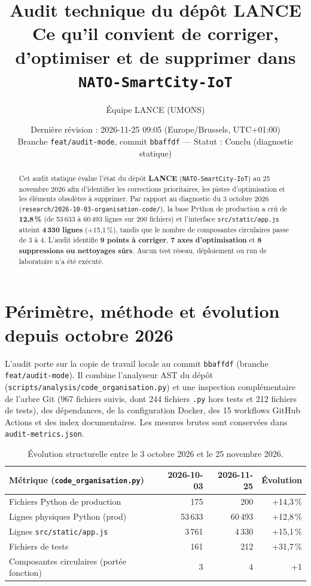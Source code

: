 \documentclass[11pt,a4paper]{article}
\title{\textbf{Audit technique du dépôt LANCE}\\
\large Ce qu'il convient de corriger, d'optimiser et de supprimer dans \texttt{NATO-SmartCity-IoT}}
\author{Équipe LANCE (UMONS)}
\date{Dernière révision : 2026-11-25 09:05 (Europe/Brussels, UTC+01:00)\\
Branche \texttt{feat/audit-mode}, commit \texttt{bbaffdf} — Statut : Conclu (diagnostic statique)}
\begin{document}
\maketitle

\begin{abstract}
Cet audit statique évalue l'état du dépôt \textbf{LANCE} (\texttt{NATO-SmartCity-IoT}) au 25 novembre 2026 afin d'identifier les corrections prioritaires, les pistes d'optimisation et les éléments obsolètes à supprimer. Par rapport au diagnostic du 3 octobre 2026 (\texttt{research/2026-10-03-organisation-code/}), la base Python de production a crû de \textbf{12,8\,\%} (de 53\,633 à 60\,493 lignes sur 200 fichiers) et l'interface \texttt{src/static/app.js} atteint \textbf{4\,330 lignes} (+15,1\,\%), tandis que le nombre de composantes circulaires passe de 3 à 4. L'audit identifie \textbf{9 points à corriger}, \textbf{7 axes d'optimisation} et \textbf{8 suppressions ou nettoyages sûrs}. Aucun test réseau, déploiement ou run de laboratoire n'a été exécuté.
\end{abstract}

\tableofcontents

\section{Périmètre, méthode et évolution depuis octobre 2026}
L'audit porte sur la copie de travail locale au commit \texttt{bbaffdf} (branche \texttt{feat/audit-mode}). Il combine l'analyseur AST du dépôt (\texttt{scripts/analysis/code\_organisation.py}) et une inspection complémentaire de l'arbre Git (967 fichiers suivis, dont 244 fichiers \texttt{.py} hors tests et 212 fichiers de tests), des dépendances, de la configuration Docker, des 15 workflows GitHub Actions et des index documentaires. Les mesures brutes sont conservées dans \texttt{audit-metrics.json}.

\begin{table}[h!]
\centering
\caption{Évolution structurelle entre le 3 octobre 2026 et le 25 novembre 2026.}
\begin{tabular}{@{}lrrr@{}}
\toprule
Métrique (\texttt{code\_organisation.py}) & 2026-10-03 & 2026-11-25 & Évolution \\
\midrule
Fichiers Python de production & 175 & 200 & +14,3\,\% \\
Lignes physiques Python (prod) & 53\,633 & 60\,493 & +12,8\,\% \\
Lignes \texttt{src/static/app.js} & 3\,761 & 4\,330 & +15,1\,\% \\
Fichiers de tests & 161 & 212 & +31,7\,\% \\
Composantes circulaires (portée fonction) & 3 & 4 & +1 \\
\bottomrule
\end{tabular}
\end{table}
\end{document}
